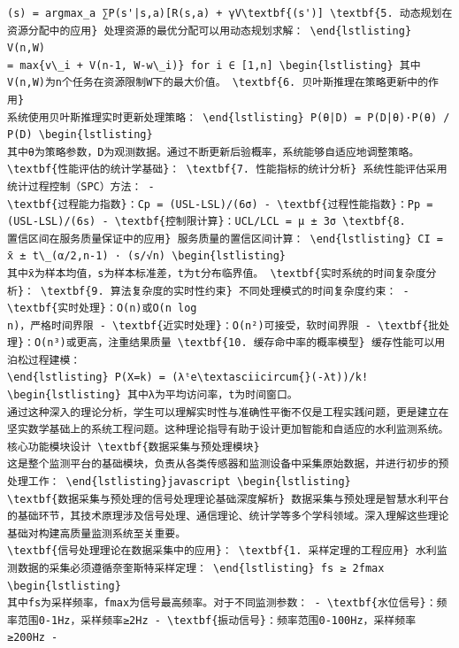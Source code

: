 \begin{verbatim}
(s) = argmax_a ∑P(s'|s,a)[R(s,a) + γV\textbf{(s')] \textbf{5. 动态规划在资源分配中的应用} 处理资源的最优分配可以用动态规划求解： \end{lstlisting} V(n,W)
= max{v\_i + V(n-1, W-w\_i)} for i ∈ [1,n] \begin{lstlisting} 其中V(n,W)为n个任务在资源限制W下的最大价值。 \textbf{6. 贝叶斯推理在策略更新中的作用}
系统使用贝叶斯推理实时更新处理策略： \end{lstlisting} P(θ|D) = P(D|θ)·P(θ) / P(D) \begin{lstlisting}
其中θ为策略参数，D为观测数据。通过不断更新后验概率，系统能够自适应地调整策略。 \textbf{性能评估的统计学基础}： \textbf{7. 性能指标的统计分析} 系统性能评估采用统计过程控制（SPC）方法： -
\textbf{过程能力指数}：Cp = (USL-LSL)/(6σ) - \textbf{过程性能指数}：Pp = (USL-LSL)/(6s) - \textbf{控制限计算}：UCL/LCL = μ ± 3σ \textbf{8.
置信区间在服务质量保证中的应用} 服务质量的置信区间计算： \end{lstlisting} CI = x̄ ± t\_(α/2,n-1) · (s/√n) \begin{lstlisting}
其中x̄为样本均值，s为样本标准差，t为t分布临界值。 \textbf{实时系统的时间复杂度分析}： \textbf{9. 算法复杂度的实时性约束} 不同处理模式的时间复杂度约束： - \textbf{实时处理}：O(n)或O(n log
n)，严格时间界限 - \textbf{近实时处理}：O(n²)可接受，软时间界限 - \textbf{批处理}：O(n³)或更高，注重结果质量 \textbf{10. 缓存命中率的概率模型} 缓存性能可以用泊松过程建模：
\end{lstlisting} P(X=k) = (λᵗe\textasciicircum{}(-λt))/k! \begin{lstlisting} 其中λ为平均访问率，t为时间窗口。
通过这种深入的理论分析，学生可以理解实时性与准确性平衡不仅是工程实践问题，更是建立在坚实数学基础上的系统工程问题。这种理论指导有助于设计更加智能和自适应的水利监测系统。 核心功能模块设计 \textbf{数据采集与预处理模块}
这是整个监测平台的基础模块，负责从各类传感器和监测设备中采集原始数据，并进行初步的预处理工作： \end{lstlisting}javascript \begin{lstlisting}
\textbf{数据采集与预处理的信号处理理论基础深度解析} 数据采集与预处理是智慧水利平台的基础环节，其技术原理涉及信号处理、通信理论、统计学等多个学科领域。深入理解这些理论基础对构建高质量监测系统至关重要。
\textbf{信号处理理论在数据采集中的应用}： \textbf{1. 采样定理的工程应用} 水利监测数据的采集必须遵循奈奎斯特采样定理： \end{lstlisting} fs ≥ 2fmax \begin{lstlisting}
其中fs为采样频率，fmax为信号最高频率。对于不同监测参数： - \textbf{水位信号}：频率范围0-1Hz，采样频率≥2Hz - \textbf{振动信号}：频率范围0-100Hz，采样频率≥200Hz -

\end{verbatim}
